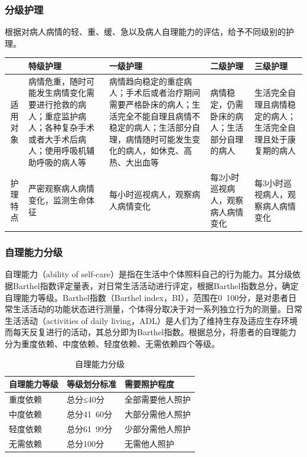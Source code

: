 \documentclass[11pt, a4paper]{ctexart}
\begin{document}
\subsubsection{分级护理}
根据对病人病情的轻、重、缓、急以及病人自理能力的评估，给予不同级别的护理。
\begin{table}[htbp]
\centering
\small
\renewcommand{\arraystretch}{1.5}
\begin{tabularx}{\textwidth}{cXXXX}
\toprule
 & \textbf{特级护理} & \textbf{一级护理} & \textbf{二级护理} & \textbf{三级护理} \\
\midrule
适用对象 & 病情危重，随时可能发生病情变化需要进行抢救的病人；重症监护病人；各种复杂手术或者大手术后病人；使用呼吸机辅助呼吸的病人等 & 病情趋向稳定的重症病人；手术后或者治疗期间需要严格卧床的病人；生活完全不能自理且病情不稳定的病人；生活部分自理，病情随时可能发生变化的病人，如休克、高热、大出血等 & 病情稳定，仍需卧床的病人；生活部分自理的病人 & 生活完全自理且病情稳定的病人；生活完全自理且处于康复期的病人 \\
\addlinespace %
护理特点 & 严密观察病人病情变化，监测生命体征 & 每小时巡视病人，观察病人病情变化 & 每2小时巡视病人，观察病人病情变化 & 每3小时巡视病人，观察病人病情变化 \\
\bottomrule
\end{tabularx}
\end{table}

\subsubsection{自理能力分级}
自理能力（ability of self-care）是指在生活中个体照料自己的行为能力。其分级依据Barthel指数评定量表，对日常生活活动进行评定，根据Barthel指数总分，确定自理能力等级。Barthel指数（Barthel index，BI），范围在0~100分，是对患者日常生活活动的功能状态进行测量，个体得分取决于对一系列独立行为的测量。日常生活活动（activities of daily living，ADL）是人们为了维持生存及适应生存环境而每天反复进行的活动，其总分即为Barthel指数。根据总分，将患者的自理能力分为重度依赖、中度依赖、轻度依赖、无需依赖四个等级。
\begin{table}[htbp]
\centering
\caption{自理能力分级}
\begin{tabular}{|l|l|l|}
\hline
\textbf{自理能力等级} & \textbf{等级划分标准} & \textbf{需要照护程度} \\
\hline
重度依赖 & 总分≤40分 & 全部需要他人照护 \\
中度依赖 & 总分41~60分 & 大部分需他人照护 \\
轻度依赖 & 总分61~99分 & 少部分需他人照护 \\
无需依赖 & 总分100分 & 无需他人照护 \\
\hline
\end{tabular}
\end{table}
\end{document}
